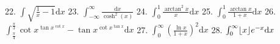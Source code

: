 \documentclass{article}
\DeclarePairedDelimiter{\floor}{\lfloor}{\rfloor}
\newcommand{\dd}{\mathrm{d}}
\begin{document}
\begin{flushleft}
22. $\int \sqrt{\frac{1}{x}-1} \dd x$ \newline  \newline \newline 
23. $\int_{-\infty}^{\infty} \frac{\dd x}{\cosh^2(x)}$ \newline  \newline \newline 
24. $\int_0^1 \frac{\arctan^2{x}}{x} \dd x$ \newline  \newline \newline 
25. $\int_0^1 \frac{\arctan{x}}{1+x} \dd x$ \newline  \newline \newline 
26. $\int_{\frac{\pi}{4}}^{\frac{\pi}{3}}  \cot{x}^{\tan{x}^{\cot{x}}}-\tan{x}^{\cot{x}^{\tan{x}}} \dd x$ \newline  \newline \newline 
27. $\int_0^{\infty} \left(\frac{\ln{x}}{1+x}\right)^2 \dd x$ \newline  \newline \newline 
28. $\int_0^{\infty} \floor{x}e^{-x} \dd x$



\end{flushleft}
\end{document}
